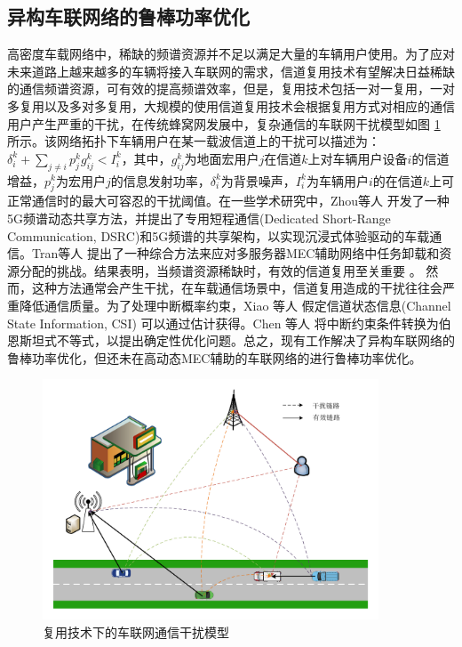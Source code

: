 \subsection{异构车联网络的鲁棒功率优化} \label{section1-2-1}

高密度车载网络中，稀缺的频谱资源并不足以满足大量的车辆用户使用。为了应对未来道路上越来越多的车辆将接入车联网的需求，信道复用技术有望解决日益稀缺的通信频谱资源，可有效的提高频谱效率，但是，复用技术包括一对一复用，一对多复用以及多对多复用，大规模的使用信道复用技术会根据复用方式对相应的通信用户产生严重的干扰，在传统蜂窝网发展中，复杂通信的车联网干扰模型如图 \ref{复用技术下的通信干扰模型} 所示。该网络拓扑下车辆用户在某一载波信道上的干扰可以描述为：$\delta _{i}^{k}+\sum\limits_{j\ne i}{p_{j}^{k}g_{ij}^{k}}<I_{i}^{k}$，其中，$g_{ij}^{k}$为地面宏用户$j$在信道$k$上对车辆用户设备$i$的信道增益，$p_{j}^{k}$为宏用户$j$的信息发射功率，$\delta _{i}^{k}$为背景噪声，$I_{i}^{k}$为车辆用户$i$的在信道$k$上可正常通信时的最大可容忍的干扰阈值。在一些学术研究中，Zhou等人  \supercite{Zhou2017} 开发了一种5G频谱动态共享方法，并提出了专用短程通信(Dedicated Short-Range Communication, DSRC)和5G频谱的共享架构，以实现沉浸式体验驱动的车载通信。Tran等人  \supercite{Tran2019}  提出了一种综合方法来应对多服务器MEC辅助网络中任务卸载和资源分配的挑战。结果表明，当频谱资源稀缺时，有效的信道复用至关重要 \supercite{Liang2021}。 然而，这种方法通常会产生干扰，在车载通信场景中，信道复用造成的干扰往往会严重降低通信质量。为了处理中断概率约束，Xiao 等人 \supercite{Xiao2020} 假定信道状态信息(Channel State Information, CSI) 可以通过估计获得。Chen 等人 \supercite{Chen2022} 将中断约束条件转换为伯恩斯坦式不等式，以提出确定性优化问题。总之，现有工作解决了异构车联网络的鲁棒功率优化，但还未在高动态MEC辅助的车联网络的进行鲁棒功率优化。
\begin{figure}[H]
\centering
\includegraphics[width=10cm]{figures//chap1//车联网的干扰模型.pdf}
\caption{复用技术下的车联网通信干扰模型}
\label{复用技术下的通信干扰模型}
\end{figure}
